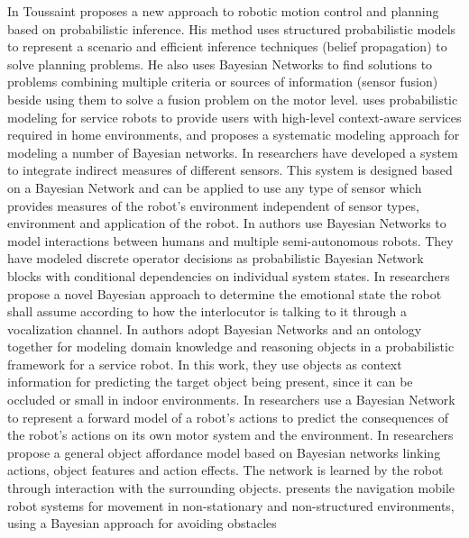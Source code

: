 \documentclass[11pt]{article}
\begin{document}
In \cite{toussaint:bayesian-motion-planning} Toussaint proposes a new approach
to robotic motion control and planning based on probabilistic inference. His
method uses structured probabilistic models to represent a scenario and
efficient inference techniques (belief propagation) to solve planning problems.
He also uses Bayesian Networks to find solutions to problems combining multiple
criteria or sources of information (sensor fusion) beside using them to solve a
fusion problem on the motor level. \cite{park:bn-service-robot} uses
probabilistic modeling for service robots to provide users with high-level
context-aware services required in home environments, and proposes a systematic
modeling approach for modeling a number of Bayesian networks. In
\cite{orozco:multisensor-bn} researchers have developed a system to integrate
indirect measures of different sensors. This system is designed based on a
Bayesian Network and can be applied to use any type of sensor which provides
measures of the robot's environment independent of sensor types, environment and
application of the robot. In \cite{bourgault:operator-multiple-robot} authors
use Bayesian Networks to model interactions between humans and multiple
semi-autonomous robots. They have modeled discrete operator decisions as
probabilistic Bayesian Network blocks with conditional dependencies on
individual system states. In \cite{prado:robot-emotion-bayesian} researchers
propose a novel Bayesian approach to determine the emotional state the robot
shall assume according to how the interlocutor is talking to it through a
vocalization channel. In \cite{song:bn-service-robot} authors adopt Bayesian
Networks and an ontology together for modeling domain knowledge and reasoning
objects in a probabilistic framework for a service robot. In this work, they use
objects as context information for predicting the target object being present,
since it can be occluded or small in indoor environments. In
\cite{dearden:forward-model-robot} researchers use a Bayesian Network to
represent a forward model of a robot's actions to predict the consequences of
the robot's actions on its own motor system and the environment. In
\cite{montesano:affordances-bn} researchers propose a general object affordance
model based on Bayesian networks linking actions, object features and action
effects. The network is learned by the robot through interaction with the
surrounding objects. \cite{vladareanu:robot-naviation-bayesian} presents the
navigation mobile robot systems for movement in non-stationary and
non-structured environments, using a Bayesian approach for avoiding obstacles
\end{document}
